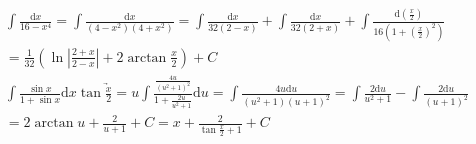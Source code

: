 \documentclass{article}
\begin{document}
\begin{align*}
    \int \frac{\mathrm{d}x}{16-x^4} = \int \frac{\mathrm{d}x}{(4-x^2)(4+x^2)} = \int \frac{\mathrm{d}x}{32(2-x)}+\int \frac{\mathrm{d}x}{32(2+x)} + \int \frac{\mathrm{d}(\frac{x}{2})}{16(1+(\frac{x}{2})^2)} \\ 
    = \frac{1}{32}\left(\ln \left|\frac{2+x}{2-x}\right| + 2\arctan \frac{x}{2}\right) + C \\
    \int \frac{\sin x}{1 + \sin x} \mathrm{d}x \underrightarrow{\tan \frac{x}{2} = u} \int \frac{\frac{4u}{(u^2+1)^2}}{1+\frac{2u}{u^2+1}} \mathrm{d}u = \int \frac{4u\mathrm{d}u}{(u^2+1)(u+1)^2} = \int \frac{2\mathrm{d}u}{u^2+1} - \int \frac{2\mathrm{d}u}{(u+1)^2} \\
    = 2\arctan u + \frac{2}{u+1} + C = x + \frac{2}{\tan \frac{x}{2} + 1} + C \\
\end{align*}


\clearpage
\end{document}
